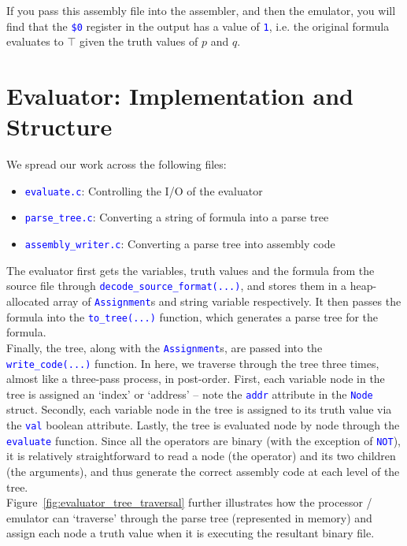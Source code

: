 \documentclass[11pt]{article}
\newcommand{\code}[1]{\mbox{\texttt{\textcolor{blue}{#1}}}}
\begin{document}
If you pass this assembly file into the assembler, and then the emulator, you will find that the \code{\$0} register in the output has a value of \code{1}, i.e. the original formula evaluates to \(\top\) given the truth values of \(p\) and \(q\).\\

\section{Evaluator: Implementation and Structure}

We spread our work across the following files:

\begin{itemize}
\item \code{evaluate.c}: Controlling the I/O of the evaluator
\item \code{parse\_tree.c}: Converting a string of formula into a parse tree
\item \code{assembly\_writer.c}: Converting a parse tree into assembly code
\end{itemize}

The evaluator first gets the variables, truth values and the formula from the source file through \code{decode\_source\_format(...)}, and stores them in a heap-allocated array of \code{Assignment}s and string variable respectively. It then passes the formula into the \code{to\_tree(...)} function, which generates a parse tree for the formula.\\

Finally, the tree, along with the \code{Assignment}s, are passed into the \code{write\_code(...)} function. In here, we traverse through the tree three times, almost like a three-pass process, in post-order. First, each variable node in the tree is assigned an `index' or `address' – note the \code{addr} attribute in the \code{Node} struct. Secondly, each variable node in the tree is assigned to its truth value via the \code{val} boolean attribute. Lastly, the tree is evaluated node by node through the \code{evaluate} function. Since all the operators are binary (with the exception of \code{NOT}), it is relatively straightforward to read a node (the operator) and its two children (the arguments), and thus generate the correct assembly code at each level of the tree.\\

Figure~\ref{fig:evaluator_tree_traversal} further illustrates how the processor / emulator can `traverse' through the parse tree (represented in memory) and assign each node a truth value when it is executing the resultant binary file.\\
\end{document}
